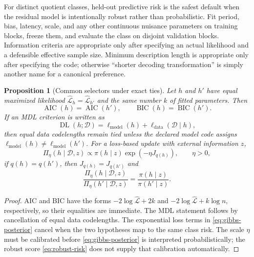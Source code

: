 \documentclass[11pt]{article}
\newtheorem{proposition}[theorem]{Proposition}
\begin{document}
    For distinct quotient classes, held-out predictive risk is the safest default when the
    residual model is intentionally robust rather than probabilistic. Fit period, bias,
    latency, scale, and any other continuous nuisance parameters on training blocks, freeze
    them, and evaluate the class on disjoint validation blocks. Information criteria are
    appropriate only after specifying an actual likelihood and a defensible effective sample
    size. Minimum description length is appropriate only after specifying the code; otherwise
    ``shorter decoding transformation'' is simply another name for a canonical preference.

    \begin{proposition}[Common selectors under exact ties]
Let $h$ and $h'$ have equal maximized likelihood
$\widehat{\mathcal L}_h=\widehat{\mathcal L}_{h'}$ and the same number $k$ of fitted
parameters. Then
\begin{equation}
    \operatorname{AIC}(h)=\operatorname{AIC}(h'),
    \qquad
    \operatorname{BIC}(h)=\operatorname{BIC}(h').
\end{equation}
If an MDL criterion is written as
\begin{equation}
    \operatorname{DL}(h;\mathcal D)
    =\ell_{\mathrm{model}}(h)+\ell_{\mathrm{data}}(\mathcal D\mid h),
\end{equation}
then equal data codelengths remain tied unless the declared model code assigns
$\ell_{\mathrm{model}}(h)\ne\ell_{\mathrm{model}}(h')$. For a loss-based update with
external information $z$,
\begin{equation}
    \Pi_\eta(h\mid\mathcal D,z)
    \propto
    \pi(h\mid z)\exp\!\left(-\eta J_{q(h)}\right),
    \qquad \eta>0,
    \label{eq:gibbs-posterior}
\end{equation}
if $q(h)=q(h')$, then $J_{q(h)}=J_{q(h')}$ and
\begin{equation}
    \frac{\Pi_\eta(h\mid\mathcal D,z)}
    {\Pi_\eta(h'\mid\mathcal D,z)}
    =
    \frac{\pi(h\mid z)}{\pi(h'\mid z)}.
\end{equation}
    \end{proposition}

    \begin{proof}
        AIC and BIC have the forms
        $-2\log\widehat{\mathcal L}+2k$ and
        $-2\log\widehat{\mathcal L}+k\log n$, respectively, so their equalities are immediate.
        The MDL statement follows by cancellation of equal data codelengths. The exponential loss terms in \eqref{eq:gibbs-posterior} cancel when the two hypotheses
        map to the same class risk. The scale
        $\eta$ must be calibrated before \eqref{eq:gibbs-posterior} is interpreted
        probabilistically; the robust score \eqref{eq:robust-risk} does not supply that
        calibration automatically.
    \end{proof}
\end{document}
